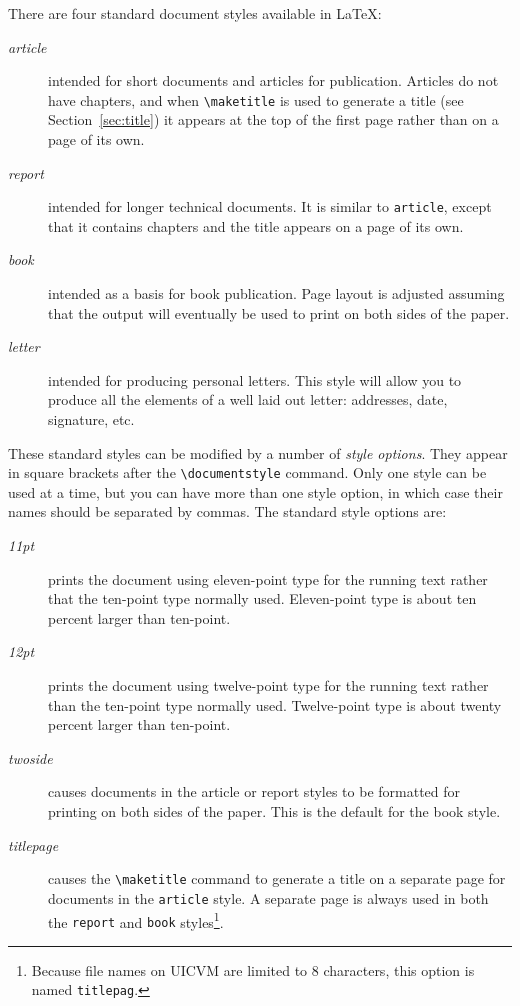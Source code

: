 \documentclass{uicthesi}
\begin{document}
There are four standard document styles available in \LaTeX:
\nobreak
\begin{description}
 
\item[{\em article}] intended for short documents and articles for
publication.
Articles do not have chapters, and when \verb+\maketitle+ is used to
generate a title (see Section~\ref{sec:title}) it appears at the top
of the first page rather than on a page of its own.
 
\item[{\em report}] intended for longer technical documents.
It is similar to {\tt article}, except that
it contains chapters and the title appears on a page of its own.
 
\item[{\em book}] intended as a basis for book publication.
Page layout is
adjusted assuming that the output will eventually be used to print on
both sides of the paper.
 
\item[{\em letter}] intended for producing personal letters.  This style
will allow you to produce all the elements of a well laid out letter:
addresses, date, signature, etc.
\end{description}
 
These standard styles can be modified by a number of
{\em style options\/}.
They appear in square brackets after the \verb+\documentstyle+ command.
Only one style can be used at a time, but you can have more than one
style option, in which case their names should be separated by commas.
The standard style options are:
\begin{description}
 
\item[{\em 11pt}]  prints the document using eleven-point type for the
running text rather that the ten-point type normally used.
Eleven-point type is about ten percent larger than ten-point.
 
\item[{\em 12pt}] prints the document using twelve-point type for
the running text
rather than the ten-point type normally used. Twelve-point type is about
twenty percent larger than ten-point.
 
\item[{\em twoside}] causes documents in the article or report styles
to be formatted for printing on both sides of the paper.
This is the default for the book style.
 
\item[{\em titlepage}] causes the \verb+\maketitle+ command to generate a
title on a separate page for documents in the {\tt article} style.
A separate page is always used in both the {\tt report} and {\tt book}
styles\footnote{Because file names on UICVM are limited to 8
characters, this option is named {\tt titlepag}.}.
\end{description}
\end{document}

